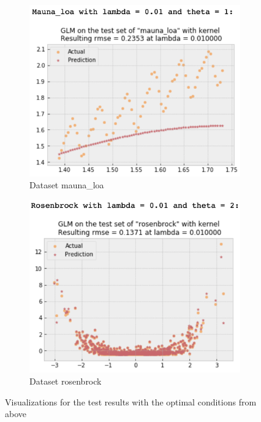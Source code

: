 \documentclass{article} %
\begin{document}
\begin{figure}[!hb]
  \centering
  \begin{subfigure}[b]{0.48\linewidth}
    \includegraphics[width=\linewidth]{Q3_1.png}
    \caption{Dataset mauna\_loa}
  \end{subfigure}
  \begin{subfigure}[b]{0.48\linewidth}
    \includegraphics[width=\linewidth]{Q3_2.png}
    \caption{Dataset rosenbrock}
  \end{subfigure}
  \caption{Visualizations for the test results with the optimal conditions from above}
  \label{fig:Q3}
\end{figure}
\end{document}

